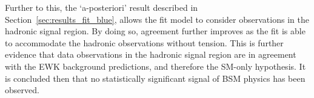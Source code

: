 Further to this, the `a-posteriori' result described in Section~\ref{sec:results_fit_blue},
allows the fit model to consider observations
in the hadronic signal region. By doing so, agreement further improves as the fit is able
to accommodate the hadronic observations without tension. This is further evidence that
data observations in the hadronic signal region are in agreement with the EWK background
predictions, and therefore the SM-only hypothesis. It is concluded then that no statistically
significant signal of BSM physics has been observed.







